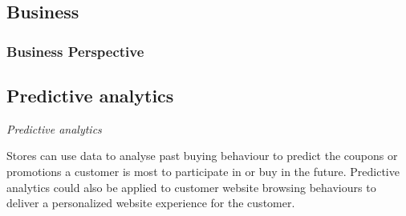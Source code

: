 \documentclass[12pt,xcolor=dvipsnames]{beamer}
\begin{document}
\subsection{Business}
\begin{frame}[t]
\frametitle{Business Perspective}

\begin{center}
\subsection{Predictive analytics }
\begin{center}

\end{center}
\textit{Predictive analytics}

\end{center}
\begin{center}


Stores can use  data to  analyse past buying behaviour to predict the coupons or promotions a customer is most to participate in or buy in the future. Predictive analytics could also be applied to customer website browsing behaviours to deliver a personalized website experience for the customer.
\end{center}

\end{frame}
\end{document}
